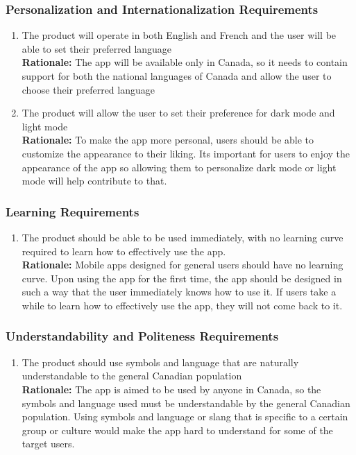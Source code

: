 \documentclass[]{article}
\begin{document}
\subsubsection{Personalization and Internationalization Requirements}
\label{ssub:personalization_and_internationalization_requirements}
\begin{enumerate}[{UH-PI}1. ]
	\item The product will operate in both English and French and the user will be able to set their preferred language \\
	{\bf Rationale:} The app will be available only in Canada, so it needs to contain support for both the national languages of Canada and allow the user to choose their preferred language
	\item The product will allow the user to set their preference for dark mode and light mode \\
	{\bf Rationale:} To make the app more personal, users should be able to customize the appearance to their liking. Its important for users to enjoy the appearance of the app so allowing them to personalize dark mode or light mode will help contribute to that.
\end{enumerate}

\subsubsection{Learning Requirements}
\label{ssub:learning_requirements}
\begin{enumerate}[{UH-L}1. ]
	\item The product should be able to be used immediately, with no learning curve required to learn how to effectively use the app. \\
	{\bf Rationale:} Mobile apps designed for general users should have no learning curve. Upon using the app for the first time, the app should be designed in such a way that the user immediately knows how to use it. If users take a while to learn how to effectively use the app, they will not come back to it.
\end{enumerate}

\subsubsection{Understandability and Politeness Requirements}
\label{ssub:understandability_and_politeness_requirements}
\begin{enumerate}[{UH-UP}1. ]
	\item The product should use symbols and language that are naturally understandable to the general Canadian population \\
	{\bf Rationale:} The app is aimed to be used by anyone in Canada, so the symbols and language used must be understandable by the general Canadian population. Using symbols and language or slang that is specific to a certain group or culture would make the app hard to understand for some of the target users.
\end{enumerate}
\end{document}
